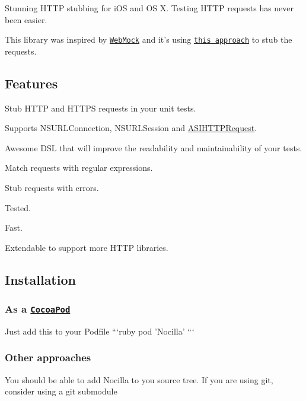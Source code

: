 Stunning H\-T\-T\-P stubbing for i\-O\-S and O\-S X. Testing H\-T\-T\-P requests has never been easier.

This library was inspired by \href{https://github.com/bblimke/webmock}{\tt Web\-Mock} and it's using \href{http://www.infinite-loop.dk/blog/2011/09/using-nsurlprotocol-for-injecting-test-data/}{\tt this approach} to stub the requests.

\subsection*{Features}


\begin{DoxyItemize}
\item Stub H\-T\-T\-P and H\-T\-T\-P\-S requests in your unit tests.
\item Supports N\-S\-U\-R\-L\-Connection, N\-S\-U\-R\-L\-Session and \hyperlink{interface_a_s_i_h_t_t_p_request}{A\-S\-I\-H\-T\-T\-P\-Request}.
\item Awesome D\-S\-L that will improve the readability and maintainability of your tests.
\item Match requests with regular expressions.
\item Stub requests with errors.
\item Tested.
\item Fast.
\item Extendable to support more H\-T\-T\-P libraries.
\end{DoxyItemize}

\subsection*{Installation}

\subsubsection*{As a \href{http://cocoapods.org/}{\tt Cocoa\-Pod}}

Just add this to your Podfile ```ruby pod 'Nocilla' ```

\subsubsection*{Other approaches}


\begin{DoxyItemize}
\item You should be able to add Nocilla to you source tree. If you are using git, consider using a {\ttfamily git submodule}
\end{DoxyItemize}

